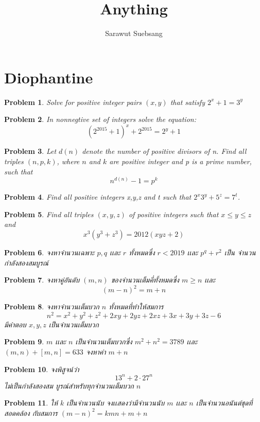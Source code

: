 \documentclass[a4paper,12pt]{article}
\author{Sarawut Suebsang}
\title{\textbf{Anything}}
\newtheorem{problem}{Problem}[section]
\begin{document}
\maketitle
\section{Diophantine}
\begin{problem}
	Solve for positive integer pairs $(x,y)$ that satisfy $2^x+1=3^y$
\end{problem}
\begin{problem}
In nonnegtive set of integers solve the equation: \[ (2^{2015}+1)^x+2^{2015}=2^y+1 \]
\end{problem}
\begin{problem}
	Let $d(n)$ denote the number of positive divisors of n. Find all triples $(n,p,k)$, where $n$ and $k$ are positive integer and p is a prime number, such that \[ n^{d(n)}-1=p^k\]
\end{problem}
\begin{problem}
	Find all positive integers x,y,z and t such that $2^x3^y+5^z=7^t$.
\end{problem}
\begin{problem}
	Find all triples $(x,y,z)$ of positive integers such that $x \le y \le z$ and \[ x^3(y^3+z^3) = 2012(xyz+2) \]
	
\end{problem}
\begin{problem}
	จงหาจำนวนเฉพาะ $p,q$ เเละ $r$ ทั้งหมดซึ่ง $r < 2019$ เเละ $p^q+r^2$ เป็น จำนวนกำลังสองสมบูรณ์
\end{problem}
\begin{problem}
	จงหาคู่อันดับ $(m,n)$ ของจำนวนเต็มคี่ทั้งหมดซึ่ง $m \ge n$ เเละ \[ (m-n)^2 = m+n \]
\end{problem}
\begin{problem}
	จงหาจำนวนเต็มบวก $n$ ทั้งหมดที่ทำให้สมการ \[ n^2 = x^2+y^2 +z^2 +2xy+2yz+2xz+3x+3y+3z-6 \] มีคำตอบ $x,y,z$ เป็นจำนวนเต็มบวก
\end{problem}
\begin{problem}
	$m$ เเละ $n$ เป็นจำนวนเต็มบวกซึ่ง $m^2+n^2 = 3789$ เเละ $(m,n)+[m,n] = 633$ จงหาค่า $m+n$
\end{problem}
\begin{problem}
	จงพิสูจน์ว่า \[ 13^n+2\cdot27^n \] ไม่เป็นกำลังสองสม บูรณ์สำหรับทุกจำนวนเต็มบวก $n$
\end{problem}
\begin{problem}
	ให้ $k$ เป็นจำนวนนับ จงเเสดงว่ามีจำนวนนับ $m$ เเละ $n$ เป็นจำนวนอนันต์ชุดที่สอดคล้อง กับสมการ $(m-n)^2= kmn+m+n$
\end{problem}
\end{document}
